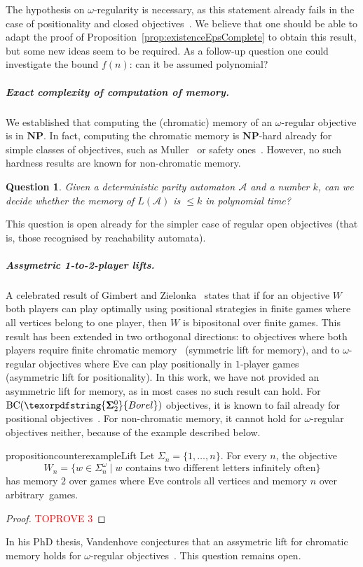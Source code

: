 \documentclass[a4paper,UKenglish,cleveref, thm-restate]{lipics-v2021}
\newtheorem{question}{Question}
\newcommand{\boldclass}[3]{\texorpdfstring{\ensuremath{\mathbf{#1}^{#2}_{#3}}}{Borel}}
\newcommand{\BCSigma}{\mathrm{BC}(\boldclass{\Sigma}{0}{2})}
\newcommand{\A}{\mathcal{A}}
\newcommand{\NP}{\textbf{NP}}
\newcommand{\oo}{\omega}
\renewcommand{\SS}{\Sigma}
\begin{document}
The hypothesis on $\oo$-regularity is necessary, as this statement already fails in the case of positionality and closed objectives~\cite{CFH14}.
We believe that one should be able to adapt the proof of Proposition~\ref{prop:existenceEpsComplete} to obtain this result, but some new ideas seem to be required.
As a follow-up question one could investigate the bound $f(n)$: can it be assumed polynomial?


\subparagraph*{Exact complexity of computation of memory.} We established that computing the (chromatic) memory of an $\omega$-regular objective is in $\NP$.
In fact, computing the chromatic memory is $\NP$-hard already for simple classes of objectives, such as Muller~\cite{Casares22Chromatic} or safety ones~\cite{BFRV23Regular}.
However, no such hardness results are known for non-chromatic memory.

\begin{question}\label{quest:ptime}
	Given a deterministic parity automaton $\A$ and a number $k$, can we decide whether the memory of $L(\A)$ is $\leq k$ in polynomial time?
\end{question}

This question is open already for the simpler case of regular open objectives (that is, those recognised by reachability automata).


\subparagraph{Assymetric 1-to-2-player lifts.} A celebrated result of Gimbert and Zielonka~\cite{GZ05} states that if for an objective $W$ both players can play optimally using positional strategies in finite games where all vertices belong to one player, then $W$ is bipositonal over finite games. This result has been extended in two orthogonal directions: to objectives where both players require finite chromatic memory~\cite{BRORV22,BRV23} (symmetric lift for memory), and to $\oo$-regular objectives where Eve can play positionally in $1$-player games~\cite{CO24Positional} (asymmetric lift for positionality).
In this work, we have not provided an asymmetric lift for memory, as in most cases no such result can hold.
For  $\BCSigma$ objectives, it is known to fail already for positional objectives~\cite[Section~7]{GK22Submixing}.
For non-chromatic memory, it cannot hold for $\oo$-regular objectives neither, because of the example described below.

\begin{restatable}{proposition}{counterexampleLift}
\label{prop:1-2-player-counterexample}
	Let $\Sigma_n = \{1,\dots, n\}$. For every $n$, the objective 
	\[W_n = \{w\in \SS_n^\oo \mid w \text{ contains two different letters infinitely often}\} \] 
	 has memory $2$ over games where Eve controls all vertices and memory $n$ over arbitrary~games.
\end{restatable}
\begin{proof}\textcolor{red}{TOPROVE 3}\end{proof}
In his PhD thesis, Vandenhove conjectures that an assymetric lift for chromatic memory holds for $\oo$-regular objectives~\cite[Conjecture~9.1.2]{Vandenhove23Thesis}. This question remains open.
\end{document}
